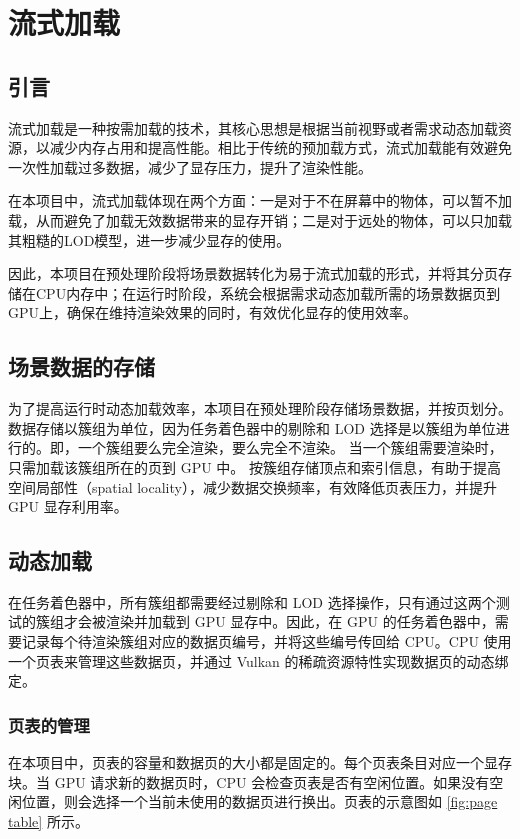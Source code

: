 \section{流式加载}

\subsection{引言}

流式加载是一种按需加载的技术，其核心思想是根据当前视野或者需求动态加载资源，以减少内存占用和提高性能。相比于传统的预加载方式，流式加载能有效避免一次性加载过多数据，减少了显存压力，提升了渲染性能。

在本项目中，流式加载体现在两个方面：一是对于不在屏幕中的物体，可以暂不加载，从而避免了加载无效数据带来的显存开销；二是对于远处的物体，可以只加载其粗糙的LOD模型，进一步减少显存的使用。

因此，本项目在预处理阶段将场景数据转化为易于流式加载的形式，并将其分页存储在CPU内存中；在运行时阶段，系统会根据需求动态加载所需的场景数据页到GPU上，确保在维持渲染效果的同时，有效优化显存的使用效率。

\subsection{场景数据的存储}

为了提高运行时动态加载效率，本项目在预处理阶段存储场景数据，并按页划分。数据存储以簇组为单位，因为任务着色器中的剔除和 LOD 选择是以簇组为单位进行的。即，一个簇组要么完全渲染，要么完全不渲染。
当一个簇组需要渲染时，只需加载该簇组所在的页到 GPU 中。  
按簇组存储顶点和索引信息，有助于提高空间局部性（spatial locality），减少数据交换频率，有效降低页表压力，并提升 GPU 显存利用率。

\subsection{动态加载}

在任务着色器中，所有簇组都需要经过剔除和 LOD 选择操作，只有通过这两个测试的簇组才会被渲染并加载到 GPU 显存中。因此，在 GPU 的任务着色器中，需要记录每个待渲染簇组对应的数据页编号，并将这些编号传回给 CPU。CPU 使用一个页表来管理这些数据页，并通过 Vulkan 的稀疏资源特性实现数据页的动态绑定。

\subsubsection{页表的管理}

在本项目中，页表的容量和数据页的大小都是固定的。每个页表条目对应一个显存块。当 GPU 请求新的数据页时，CPU 会检查页表是否有空闲位置。如果没有空闲位置，则会选择一个当前未使用的数据页进行换出。页表的示意图如 \autoref{fig:page table} 所示。

